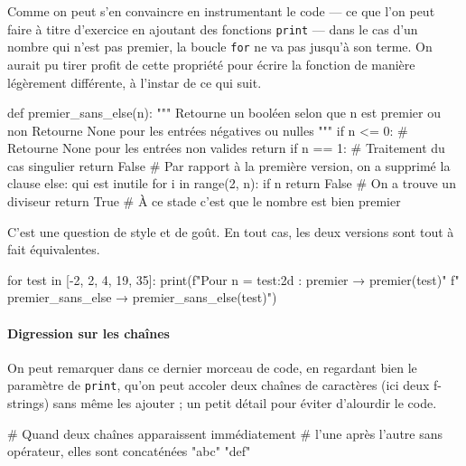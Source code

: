 Comme on peut s'en convaincre en instrumentant le code --- ce que l'on peut faire à titre d'exercice en ajoutant des fonctions \texttt{print} --- dans le cas d'un nombre qui n'est pas premier, la boucle \texttt{for} ne va pas jusqu'à son terme.
On aurait pu tirer profit de cette propriété pour écrire la fonction de manière légèrement différente, à l'instar de ce qui suit.

\begin{idleconsole*}
\begin{pyconsole}
def premier_sans_else(n):
    """
    Retourne un booléen selon que n est premier ou non
    Retourne None pour les entrées négatives ou nulles
    """
    if n <= 0: # Retourne None pour les entrées non valides
        return
    if n == 1: # Traitement du cas singulier
        return False
    # Par rapport à la première version, on a supprimé la clause else: qui est inutile
    for i in range(2, n):
        if n %
            return False # On a trouve un diviseur
    return True # À ce stade c'est que le nombre est bien premier

\end{pyconsole}
\end{idleconsole*}


C'est une question de style et de goût. En tout cas, les deux versions sont tout à fait équivalentes.

\begin{idleconsole}
\begin{pyconsole}
for test in [-2, 2, 4, 19, 35]:
    print(f"Pour n = {test:2d} : premier → {premier(test)}\n"
          f"    premier_sans_else → {premier_sans_else(test)}\n")

\end{pyconsole}
\end{idleconsole}

\paragraph*{Digression sur les chaînes}
On peut remarquer dans ce dernier morceau de code, en regardant bien le paramètre de \texttt{print}, qu'on peut accoler deux chaînes de caractères (ici deux f-strings) sans même les ajouter ; un petit détail pour éviter d'alourdir le code.

\begin{idleconsole}
\begin{pyconsole}
# Quand deux chaînes apparaissent immédiatement
# l'une après l'autre sans opérateur, elles sont concaténées
"abc" "def"
\end{pyconsole}
\end{idleconsole}

